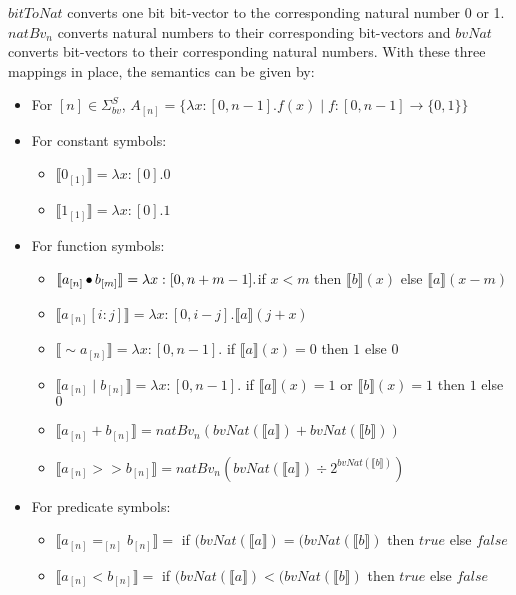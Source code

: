 \noindent $bitToNat$ converts one bit bit-vector to the corresponding natural number 0 or 1. $natBv_n$ converts natural numbers to their corresponding bit-vectors and $bvNat$ converts bit-vectors to their corresponding natural numbers. With these three mappings in place, the semantics can be given by:

\begin{itemize}

\item For $[n] \in \Sigma_{bv}^S$, $A_{[n]} = \{\lambda x : [0, n-1].f (x) \mid f : [0, n-1] \rightarrow \{0, 1\}\}$
\item For constant symbols:
\begin{itemize}
\item  $\llbracket 0_{[1]}\rrbracket = \lambda x : [0].0$
\item $\llbracket 1_{[1]}\rrbracket = \lambda x : [0].1$
\end{itemize}
\item For function symbols:
\begin{itemize}

\item $\llbracket a_{[n]} \mathop{\bullet} b_{[m]}\rrbracket = \lambda x : [0, n+m-1].$if $x < m$ then $\llbracket b\rrbracket(x)$ else $\llbracket a\rrbracket(x-m)$

\item $\llbracket a_{[n]} [i:j]\rrbracket = \lambda x : [0,i-j]. \llbracket a\rrbracket(j+x)$
\item $\llbracket \sim a_{[n]}\rrbracket
= \lambda x : [0, n-1].$ if $\llbracket a\rrbracket(x)=0$ then $1$ else $0$

\item $\llbracket a_{[n]} \mid b_{[n]}\rrbracket = \lambda x : [0, n-1].$ if $\llbracket a\rrbracket(x) =1$ or $\llbracket b\rrbracket(x)=1$ then $1$ else $0$

\item $ \llbracket a_{[n]} + b_{[n]}\rrbracket = natBv_n (bvNat(\llbracket a \rrbracket) + bvNat(\llbracket b \rrbracket))$

\item $\llbracket a_{[n]} >> b_{[n]}\rrbracket = natBv_n (bvNat(\llbracket a \rrbracket) \div 2^{bvNat(\llbracket b \rrbracket)})$

\end{itemize}

\item For predicate symbols:
\begin{itemize}
\item $\llbracket a_{[n]} =_{[n]} b_{[n]}\rrbracket =$ if $(bvNat(\llbracket a \rrbracket) = (bvNat(\llbracket b \rrbracket)$ then $true$ else $false$
\item $\llbracket a_{[n]} < b_{[n]}\rrbracket =$ if $(bvNat(\llbracket a \rrbracket) < (bvNat(\llbracket b \rrbracket)$ then $true$ else $false$
\end{itemize}
\end{itemize}

